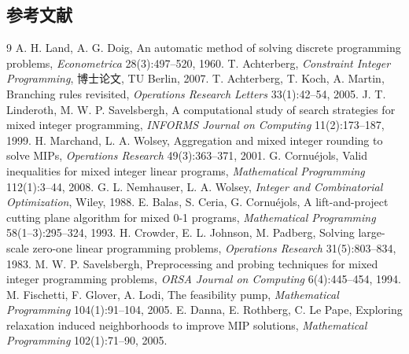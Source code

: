 \subsection{参考文献}

\begin{thebibliography}{9}\small
{} A. H. Land, A. G. Doig,
An automatic method of solving discrete programming problems,
\emph{Econometrica} 28(3):497--520, 1960.
 T. Achterberg,
\emph{Constraint Integer Programming}, 博士论文, TU Berlin, 2007.
 T. Achterberg, T. Koch, A. Martin,
Branching rules revisited,
\emph{Operations Research Letters} 33(1):42--54, 2005.
 J. T. Linderoth, M. W. P. Savelsbergh,
A computational study of search strategies for mixed integer programming,
\emph{INFORMS Journal on Computing} 11(2):173--187, 1999.
 H. Marchand, L. A. Wolsey,
Aggregation and mixed integer rounding to solve MIPs,
\emph{Operations Research} 49(3):363--371, 2001.
 G. Cornu\'ejols,
Valid inequalities for mixed integer linear programs,
\emph{Mathematical Programming} 112(1):3--44, 2008.
 G. L. Nemhauser, L. A. Wolsey,
\emph{Integer and Combinatorial Optimization}, Wiley, 1988.
 E. Balas, S. Ceria, G. Cornu\'ejols,
A lift-and-project cutting plane algorithm for mixed 0-1 programs,
\emph{Mathematical Programming} 58(1--3):295--324, 1993.
 H. Crowder, E. L. Johnson, M. Padberg,
Solving large-scale zero-one linear programming problems,
\emph{Operations Research} 31(5):803--834, 1983.
 M. W. P. Savelsbergh,
Preprocessing and probing techniques for mixed integer programming problems,
\emph{ORSA Journal on Computing} 6(4):445--454, 1994.
 M. Fischetti, F. Glover, A. Lodi,
The feasibility pump,
\emph{Mathematical Programming} 104(1):91--104, 2005.
 E. Danna, E. Rothberg, C. Le Pape,
Exploring relaxation induced neighborhoods to improve MIP solutions,
\emph{Mathematical Programming} 102(1):71--90, 2005.
\end{thebibliography}
